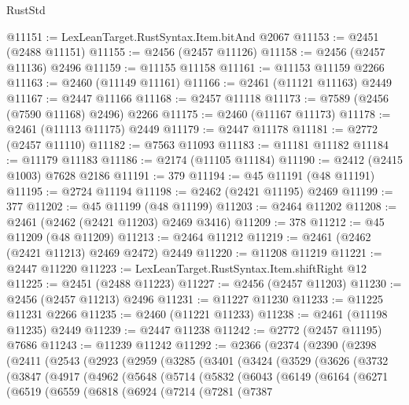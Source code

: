 \begin{lexlean}{RustStd}
\begin{coremodule}
@11151 := LexLeanTarget.RustSyntax.Item.bitAnd @2067
@11153 := @2451 (@2488 @11151)
@11155 := @2456 (@2457 @11126)
@11158 := @2456 (@2457 @11136) @2496
@11159 := @11155 @11158
@11161 := @11153 @11159 @2266
@11163 := @2460 (@11149 @11161)
@11166 := @2461 (@11121 @11163) @2449
@11167 := @2447 @11166
@11168 := @2457 @11118
@11173 := @7589 (@2456 (@7590 @11168) @2496) @2266
@11175 := @2460 (@11167 @11173)
@11178 := @2461 (@11113 @11175) @2449
@11179 := @2447 @11178
@11181 := @2772 (@2457 @11110)
@11182 := @7563 @11093
@11183 := @11181 @11182
@11184 := @11179 @11183
@11186 := @2174 (@11105 @11184)
@11190 := @2412 (@2415 @1003) @7628 @2186
@11191 := 379
@11194 := @45 @11191 (@48 @11191)
@11195 := @2724 @11194
@11198 := @2462 (@2421 @11195) @2469
@11199 := 377
@11202 := @45 @11199 (@48 @11199)
@11203 := @2464 @11202
@11208 := @2461 (@2462 (@2421 @11203) @2469 @3416)
@11209 := 378
@11212 := @45 @11209 (@48 @11209)
@11213 := @2464 @11212
@11219 := @2461 (@2462 (@2421 @11213) @2469 @2472) @2449
@11220 := @11208 @11219
@11221 := @2447 @11220
@11223 := LexLeanTarget.RustSyntax.Item.shiftRight @12
@11225 := @2451 (@2488 @11223)
@11227 := @2456 (@2457 @11203)
@11230 := @2456 (@2457 @11213) @2496
@11231 := @11227 @11230
@11233 := @11225 @11231 @2266
@11235 := @2460 (@11221 @11233)
@11238 := @2461 (@11198 @11235) @2449
@11239 := @2447 @11238
@11242 := @2772 (@2457 @11195) @7686
@11243 := @11239 @11242
@11292 := @2366
    (@2374
      (@2390
        (@2398
          (@2411
            (@2543
              (@2923
                (@2959
                  (@3285
                    (@3401
                      (@3424
                        (@3529
                          (@3626
                            (@3732
                              (@3847
                                (@4917
                                  (@4962
                                    (@5648
                                      (@5714
                                        (@5832
                                          (@6043
                                            (@6149
                                              (@6164
                                                (@6271
                                                  (@6519
                                                    (@6559
                                                      (@6818
                                                        (@6924
                                                          (@7214
                                                            (@7281
                                                              (@7387

\end{coremodule}
\end{lexlean}
